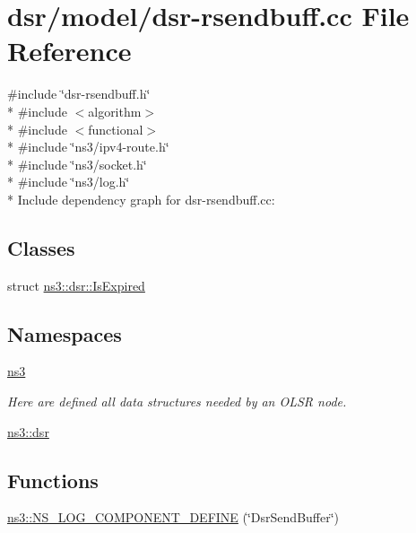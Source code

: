 \hypertarget{dsr-rsendbuff_8cc}{}\section{dsr/model/dsr-\/rsendbuff.cc File Reference}
\label{dsr-rsendbuff_8cc}
{\ttfamily \#include \char`\"{}dsr-\/rsendbuff.\+h\char`\"{}}\\*
{\ttfamily \#include $<$algorithm$>$}\\*
{\ttfamily \#include $<$functional$>$}\\*
{\ttfamily \#include \char`\"{}ns3/ipv4-\/route.\+h\char`\"{}}\\*
{\ttfamily \#include \char`\"{}ns3/socket.\+h\char`\"{}}\\*
{\ttfamily \#include \char`\"{}ns3/log.\+h\char`\"{}}\\*
Include dependency graph for dsr-\/rsendbuff.cc\+:
\subsection*{Classes}
\begin{DoxyCompactItemize}
\item 
struct \hyperlink{structns3_1_1dsr_1_1IsExpired}{ns3\+::dsr\+::\+Is\+Expired}
\end{DoxyCompactItemize}
\subsection*{Namespaces}
\begin{DoxyCompactItemize}
\item 
 \hyperlink{namespacens3}{ns3}
\begin{DoxyCompactList}\small\item\em Here are defined all data structures needed by an O\+L\+SR node. \end{DoxyCompactList}\item 
 \hyperlink{namespacens3_1_1dsr}{ns3\+::dsr}
\end{DoxyCompactItemize}
\subsection*{Functions}
\begin{DoxyCompactItemize}
\item 
\hyperlink{namespacens3_a5c2646b1b103a17d383319e10667ab04}{ns3\+::\+N\+S\+\_\+\+L\+O\+G\+\_\+\+C\+O\+M\+P\+O\+N\+E\+N\+T\+\_\+\+D\+E\+F\+I\+NE} (\char`\"{}Dsr\+Send\+Buffer\char`\"{})
\end{DoxyCompactItemize}
